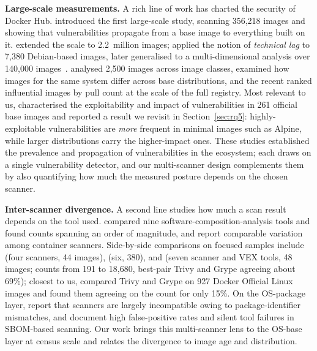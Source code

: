 \documentclass[12pt]{article}
\begin{document}
\noindent\textbf{Large-scale measurements.} A rich line of work has charted the security of Docker Hub. \cite{shu2017dockerhub}
introduced the first large-scale study, scanning 356{,}218 images and showing
that vulnerabilities propagate from a base image to everything built on it.
\cite{liu2020understanding} extended the scale to 2.2~million images;
\cite{zerouali2019outdated} applied the notion of \emph{technical lag} to
7{,}380 Debian-based images, later generalised to a multi-dimensional analysis
over 140{,}000 images~\cite{zerouali2021techlag}. \cite{wist2021vulnerability}
analysed 2{,}500 images across image classes, \cite{ibrahim2020toomany} examined
how images for the same system differ across base distributions, and the recent
\cite{shi2025drdocker} ranked influential images by pull count at the scale of
the full registry. Most relevant to us, \cite{haque2022wellbegun} characterised
the exploitability and impact of vulnerabilities in 261 official base images and
reported a result we revisit in Section~\ref{sec:rq5}: highly-exploitable
vulnerabilities are \emph{more} frequent in minimal images such as Alpine, while
larger distributions carry the higher-impact ones. These studies established the
prevalence and propagation of vulnerabilities in the ecosystem; each draws on a
single vulnerability detector, and our multi-scanner design complements them by
also quantifying how much the measured posture depends on the chosen scanner.

\noindent\textbf{Inter-scanner divergence.} A second line studies how much a
scan result depends on the tool used. \cite{imtiaz2021comparative} compared nine
software-composition-analysis tools and found counts spanning an order of
magnitude, and \cite{javed2021evaluation,javed2021quality} report comparable
variation among container scanners. Side-by-side comparisons on focused samples
include \cite{kaur2021scientific} (four scanners, 44 images),
\cite{mills2023longitudinal} (six, 380), and \cite{churakova2026vex} (seven
scanner and VEX tools, 48 images; counts from 191 to 18{,}680, best-pair Trivy
and Grype agreeing about 69\%); closest to us, \cite{boles2024deciphering}
compared Trivy and Grype on 927 Docker Official Linux images and found them
agreeing on the count for only 15\%. On the OS-package layer,
\cite{bufalino2025sbomproof} report that scanners are largely incompatible owing
to package-identifier mismatches, and \cite{zhou2026realitycheck,rosso2026svstest}
document high false-positive rates and silent tool failures in SBOM-based
scanning. Our work brings this multi-scanner lens to the OS-base layer at census
scale and relates the divergence to image age and distribution.
\end{document}
